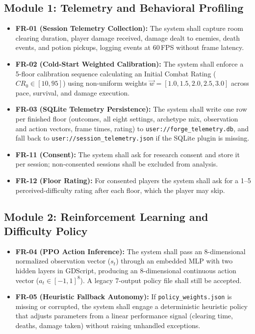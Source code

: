 \subsection{Module 1: Telemetry and Behavioral Profiling}
\begin{itemize}
    \item \textbf{FR-01 (Session Telemetry Collection):} The system shall capture room clearing duration, player damage received, damage dealt to enemies, death events, and potion pickups, logging events at 60\,FPS without frame latency.
    \item \textbf{FR-02 (Cold-Start Weighted Calibration):} The system shall enforce a 5-floor calibration sequence calculating an Initial Combat Rating ($CR_0 \in [10, 95]$) using non-uniform weights $\vec{w} = [1.0, 1.5, 2.0, 2.5, 3.0]$ across pace, survival, and damage execution.
    \item \textbf{FR-03 (SQLite Telemetry Persistence):} The system shall write one row per finished floor (outcomes, all eight settings, archetype mix, observation and action vectors, frame times, rating) to \texttt{user://forge\_telemetry.db}, and fall back to \texttt{user://session\_telemetry.json} if the SQLite plugin is missing.
    \item \textbf{FR-11 (Consent):} The system shall ask for research consent and store it per session; non-consented sessions shall be excluded from analysis.
    \item \textbf{FR-12 (Floor Rating):} For consented players the system shall ask for a 1--5 perceived-difficulty rating after each floor, which the player may skip.
\end{itemize}

\subsection{Module 2: Reinforcement Learning and Difficulty Policy}
\begin{itemize}
    \item \textbf{FR-04 (PPO Action Inference):} The system shall pass an 8-dimensional normalized observation vector ($s_t$) through an embedded MLP with two hidden layers in GDScript, producing an 8-dimensional continuous action vector ($a_t \in [-1, 1]^8$). A legacy 7-output policy file shall still be accepted.
    \item \textbf{FR-05 (Heuristic Fallback Autonomy):} If \texttt{policy\_weights.json} is missing or corrupted, the system shall engage a deterministic heuristic policy that adjusts parameters from a linear performance signal (clearing time, deaths, damage taken) without raising unhandled exceptions.
\end{itemize}

